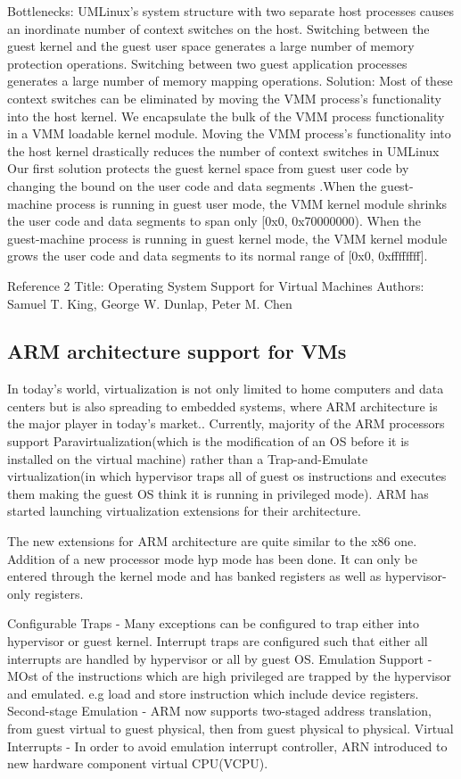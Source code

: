 \documentclass[runningheads]{llncs}
\begin{document}
Bottlenecks:
UMLinux’s system structure with two separate host processes causes an inordinate number of context switches on the host.
Switching between the guest kernel and the guest user space generates a large number of memory protection operations.
Switching between two guest application processes generates a large number of memory mapping operations.\newline
Solution:
Most of these context switches can be eliminated by moving the VMM process’s functionality into the host kernel. We encapsulate the bulk of the VMM process functionality in a VMM loadable kernel module. Moving the VMM process’s functionality into the host kernel drastically reduces the number of context switches in UMLinux\newline
Our first solution protects the guest
kernel space from guest user code by changing the bound on
the user code and data segments .When the guest-machine
process is running in guest user mode, the VMM kernel
module shrinks the user code and data segments to span
only [0x0, 0x70000000). When the guest-machine process is
running in guest kernel mode, the VMM kernel module grows
the user code and data segments to its normal range of [0x0,
0xffffffff].


Reference 2
Title: Operating System Support for Virtual Machines
Authors: Samuel T. King, George W. Dunlap, Peter M. Chen

\subsection{ARM architecture support for VMs}
In today's world, virtualization is not only limited to home computers and data centers but is also spreading to embedded systems, where ARM architecture is the major player in today’s market.. Currently, majority of the ARM processors support Paravirtualization(which is the modification of an OS before it is installed on the virtual machine) rather than a Trap-and-Emulate virtualization(in which hypervisor traps all of guest os instructions and executes them making the guest OS think it is running in privileged mode). ARM has started launching virtualization extensions for their architecture.

The new extensions for ARM architecture are quite similar to the x86 one. Addition of a new processor mode hyp mode has been done. It can only be entered through the kernel mode and has banked registers as well as hypervisor-only registers. 

Configurable Traps - Many exceptions can be configured to trap either into hypervisor or guest kernel. Interrupt traps are configured such that either all interrupts are handled by hypervisor or all by guest OS.
Emulation Support - MOst of the instructions which are high privileged are trapped by the hypervisor and emulated. e.g load and store instruction which include device registers.
Second-stage Emulation - ARM now supports two-staged address translation, from guest virtual to guest physical, then from guest physical to physical.
Virtual Interrupts - In order to avoid emulation interrupt controller, ARN introduced to new hardware component virtual CPU(VCPU).
\end{document}

